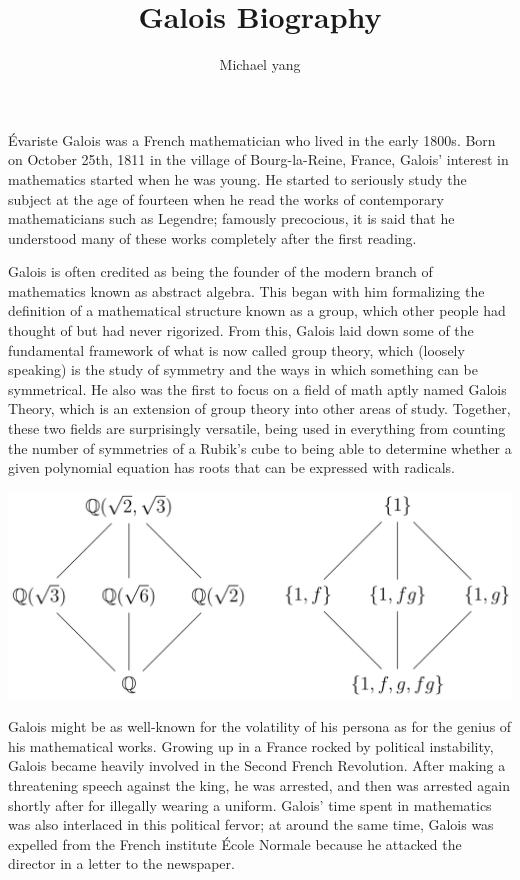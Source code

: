 \documentclass{article}
\title{Galois Biography}
\author{Michael yang}
\begin{document}
Évariste Galois was a French mathematician who lived in the early 1800s. Born on October 25th, 1811 in the village of Bourg-la-Reine, France, Galois’ interest in mathematics started when he was young. He started to seriously study the subject at the age of fourteen when he read the works of contemporary mathematicians such as Legendre; famously precocious, it is said that he understood many of these works completely after the first reading. 

Galois is often credited as being the founder of the modern branch of mathematics known as abstract algebra. This began with him formalizing the definition of a mathematical structure known as a group, which other people had thought of but had never rigorized. From this, Galois laid down some of the fundamental framework of what is now called group theory, which (loosely speaking) is the study of symmetry and the ways in which something can be symmetrical. He also was the first to focus on a field of math aptly named Galois Theory, which is an extension of group theory into other areas of study. Together, these two fields are surprisingly versatile, being used in everything from counting the number of symmetries of a Rubik’s cube to being able to determine whether a given polynomial equation has roots that can be expressed with radicals.

\begin{center}
    \includegraphics[width=6in]{images/galois-theory.png}
\end{center}

Galois might be as well-known for the volatility of his persona as for the genius of his mathematical works. Growing up in a France rocked by political instability, Galois became heavily involved in the Second French Revolution. After making a threatening speech against the king, he was arrested, and then was arrested again shortly after for illegally wearing a uniform. Galois’ time spent in mathematics was also interlaced in this political fervor; at around the same time, Galois was expelled from the French institute École Normale because he attacked the director in a letter to the newspaper. 
\end{document}
